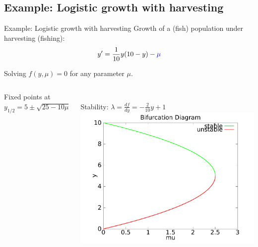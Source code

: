 \documentclass{beamer}
\begin{document}
\subsection{Example: Logistic growth with harvesting}
\begin{frame}{Example: Logistic growth with harvesting}
    Growth of a (fish) population under harvesting (fishing):
    $$y' = \frac{1}{10}y(10 - y) - \textcolor{blue}{\mu} $$

    Solving $f(y,\mu) = 0$ for any parameter $\mu$. 
     \pause
     \begin{columns}
            Fixed points at $y_{1/2} = 5 \pm \sqrt{25 - 10 \mu}$
            
            ~\\
            
            Stability: $\lambda = \frac{df}{dy} = -\frac{2}{10} y + 1$
            \includegraphics[width=1\textwidth]{grafik/harvesting}
    \end{columns}
\end{frame}

\end{document}

